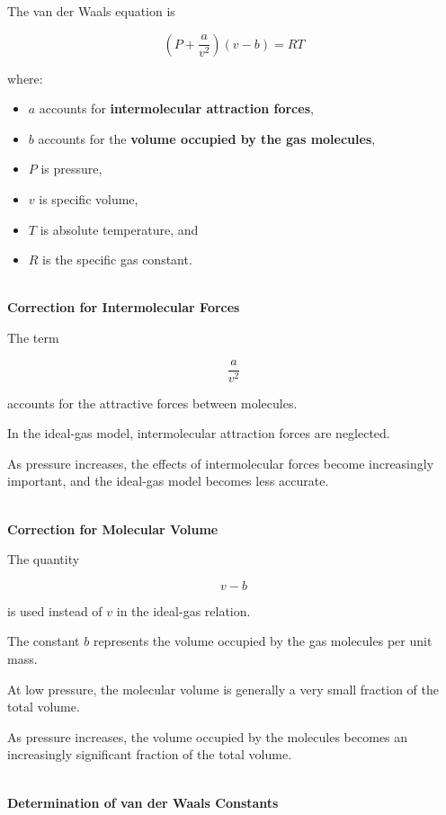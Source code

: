 \documentclass[12pt]{article}
\begin{document}
The van der Waals equation is

\begin{equation*}
\boxed{
\left(P+\frac{a}{v^2}\right)(v-b)=RT
}
\end{equation*}

where:
\begin{itemize}
    \item $a$ accounts for \textbf{intermolecular attraction forces},
    \item $b$ accounts for the \textbf{volume occupied by the gas molecules},
    \item $P$ is pressure,
    \item $v$ is specific volume,
    \item $T$ is absolute temperature, and
    \item $R$ is the specific gas constant.
\end{itemize}

\textbf{\\ Correction for Intermolecular Forces}

The term

\begin{equation*}
\frac{a}{v^2}
\end{equation*}

accounts for the attractive forces between molecules.

In the ideal-gas model, intermolecular attraction forces are neglected.

As pressure increases, the effects of intermolecular forces become increasingly important, and the ideal-gas model becomes less accurate.

\textbf{\\ Correction for Molecular Volume}

The quantity

\begin{equation*}
v-b
\end{equation*}

is used instead of $v$ in the ideal-gas relation.

The constant $b$ represents the volume occupied by the gas molecules per unit mass.

At low pressure, the molecular volume is generally a very small fraction of the total volume.

As pressure increases, the volume occupied by the molecules becomes an increasingly significant fraction of the total volume.

\textbf{\\ Determination of van der Waals Constants}
\end{document}
